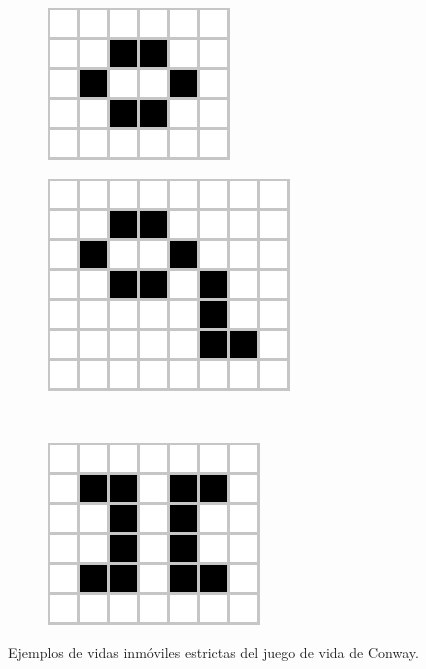 \documentclass[../proyecto.tex]{memoir}
\begin{document}
\begin{figure}[H]
	\centering
	\begin{subfigure}[b]{0.3\linewidth} 
        \centering
        \includegraphics[height=.45\linewidth]{./images/beehive.png}
        \caption{}
        \label{fig:2-1}
    \end{subfigure}
    \quad
	\begin{subfigure}[b]{0.3\linewidth} 
        \centering
        \includegraphics[height=.5\linewidth]{./images/beehive_with_tail.png}
        \caption{}
        \label{fig:2-2}
    \end{subfigure}
	\\    
    \begin{subfigure}[b]{0.3\linewidth} 
        \centering
        \includegraphics[height=0.5\linewidth]{./images/table_on_table.png}
        \caption{}
        \label{fig:2-3}
    \end{subfigure}
	\caption{Ejemplos de vidas inmóviles estrictas del juego de vida de Conway.}
	\label{fig:congIniciales}
\end{figure} 
\end{document}
